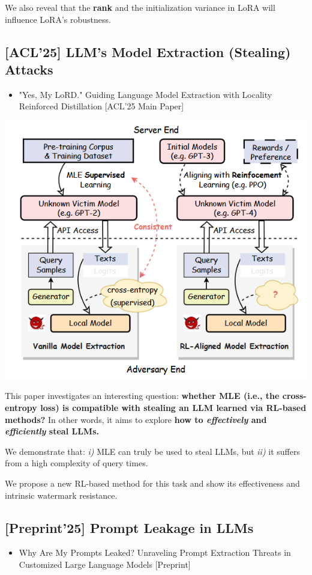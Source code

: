 \documentclass[11pt]{article}
\begin{document}
We also reveal that the \textbf{rank} and the initialization variance in LoRA will influence LoRA's robustness.
\subsection{{[}ACL'25] LLM's Model Extraction (Stealing) Attacks}
\label{sec:org9b4111a}
\begin{itemize}
\item "Yes, My LoRD." Guiding Language Model Extraction with Locality Reinforced Distillation [ACL'25 Main Paper]
\end{itemize}

\begin{center}
\includegraphics[width=.9\linewidth]{./images/screenshot_20250309_221216.png}
\end{center}

This paper investigates an interesting question: \textbf{whether MLE (i.e., the cross-entropy loss) is compatible with stealing an LLM learned via RL-based methods?} In other words, it aims to explore \textbf{how to \emph{effectively} and \emph{efficiently} steal LLMs.}

We demonstrate that: \emph{i)} MLE can truly be used to steal LLMs, but \emph{ii)} it suffers from a high complexity of query times.

We propose a new RL-based method for this task and show its effectiveness and intrinsic watermark resistance.
\subsection{{[}Preprint'25] Prompt Leakage in LLMs}
\label{sec:org371a9df}
\begin{itemize}
\item Why Are My Prompts Leaked? Unraveling Prompt Extraction Threats in Customized Large Language Models [Preprint]
\end{itemize}
\end{document}
